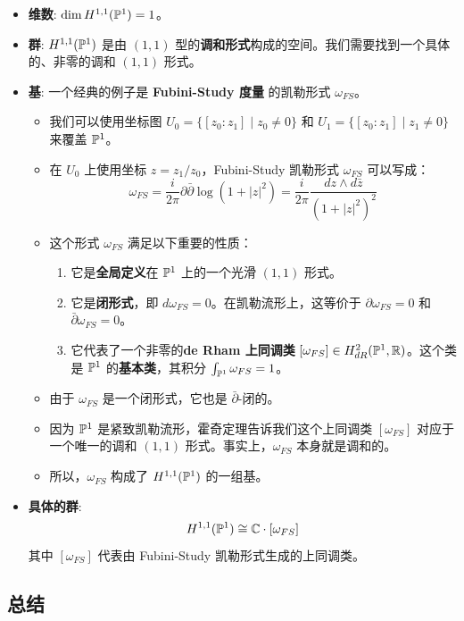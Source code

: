 \documentclass{amsart}
\let\originalmathbb\mathbb
\renewcommand{\mathbb}[1]{%
    \ifstrequal{#1}{1}{\mathbbm{#1}}{\originalmathbb{#1}}%
}
\theoremstyle{plain}
\theoremstyle{definition}
\theoremstyle{remark}
\begin{document}
\begin{itemize}
	\item \textbf{维数}: $\dim H^{1,1}(\mathbb{P}^1) = 1$。
	\item \textbf{群}: $H^{1,1}(\mathbb{P}^1)$ 是由 $(1,1)$ 型的\textbf{调和形式}构成的空间。我们需要找到一个具体的、非零的调和 $(1,1)$ 形式。
	\item \textbf{基}: 一个经典的例子是 \textbf{Fubini-Study 度量} 的凯勒形式 $\omega_{FS}$。
	\begin{itemize}
		\item 我们可以使用坐标图 $U_0 = \{[z_0:z_1] \mid z_0 \neq 0\}$ 和 $U_1 = \{[z_0:z_1] \mid z_1 \neq 0\}$ 来覆盖 $\mathbb{P}^1$。
		\item 在 $U_0$ 上使用坐标 $z = z_1/z_0$，Fubini-Study 凯勒形式 $\omega_{FS}$ 可以写成：
\[
\omega_{FS} = \frac{i}{2\pi} \partial\bar{\partial} \log(1+|z|^2) = \frac{i}{2\pi} \frac{dz \wedge d\bar{z}}{(1+|z|^2)^2}
\]
		\item 这个形式 $\omega_{FS}$ 满足以下重要的性质：
		\begin{enumerate}
			\item 它是\textbf{全局定义}在 $\mathbb{P}^1$ 上的一个光滑 $(1,1)$ 形式。
			\item 它是\textbf{闭形式}，即 $d\omega_{FS}=0$。在凯勒流形上，这等价于 $\partial\omega_{FS}=0$ 和 $\bar{\partial}\omega_{FS}=0$。
			\item 它代表了一个非零的\textbf{de Rham 上同调类} $[\omega_{FS}] \in H^2_{dR}(\mathbb{P}^1, \mathbb{R})$。这个类是 $\mathbb{P}^1$ 的\textbf{基本类}，其积分 $\int_{\mathbb{P}^1} \omega_{FS} = 1$。
		\end{enumerate}
		\item 由于 $\omega_{FS}$ 是一个闭形式，它也是 $\bar{\partial}$-闭的。
		\item 因为 $\mathbb{P}^1$ 是紧致凯勒流形，霍奇定理告诉我们这个上同调类 $[\omega_{FS}]$ 对应于一个唯一的调和 $(1,1)$ 形式。事实上，$\omega_{FS}$ 本身就是调和的。
		\item 所以，$\omega_{FS}$ 构成了 $H^{1,1}(\mathbb{P}^1)$ 的一组基。
	\end{itemize}
	\item \textbf{具体的群}:
\[
H^{1,1}(\mathbb{P}^1) \cong \mathbb{C} \cdot [\omega_{FS}]
\]
其中 $[\omega_{FS}]$ 代表由 Fubini-Study 凯勒形式生成的上同调类。
\end{itemize}

\subsection{总结}
\end{document}

